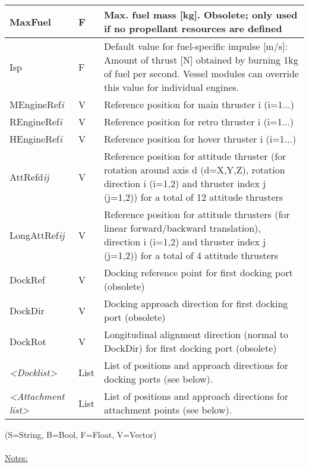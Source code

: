\documentclass[Orbiter Developer Manual.tex]{subfiles}
\begin{document}
\begin{longtable}{ |p{}|p{}|p{}| }
	\hline\rule{0pt}{2ex}
	MaxFuel & F & Max. fuel mass [kg]. Obsolete; only used if no propellant resources are defined\\
	\hline\rule{0pt}{2ex}
	Isp & F & Default value for fuel-specific impulse [m/s]: Amount of thrust [N] obtained by burning 1kg of fuel per second. Vessel modules can override this value for individual engines.\\
	\hline\rule{0pt}{2ex}
	MEngineRef\textit{i} & V & Reference position for main thruster i (i=1...)\\
	\hline\rule{0pt}{2ex}
	REngineRef\textit{i} & V & Reference position for retro thruster i (i=1...)\\
	\hline\rule{0pt}{2ex}
	HEngineRef\textit{i} & V & Reference position for hover thruster i (i=1...)\\
	\hline\rule{0pt}{2ex}
	AttRefd\textit{ij} & V & Reference position for attitude thruster (for rotation around axis d (d=X,Y,Z), rotation direction i (i=1,2) and thruster index j (j=1,2)) for a total of 12 attitude thrusters\\
	\hline\rule{0pt}{2ex}
	LongAttRef\textit{ij} & V & Reference position for attitude thrusters (for linear forward/backward translation), direction i (i=1,2) and thruster index j (j=1,2)) for a total of 4 attitude thrusters\\
	\hline\rule{0pt}{2ex}
	DockRef & V & Docking reference point for first docking port (obsolete)\\
	\hline\rule{0pt}{2ex}
	DockDir & V & Docking approach direction for first docking port (obsolete)\\
	\hline\rule{0pt}{2ex}
	DockRot & V & Longitudinal alignment direction (normal to DockDir) for first docking port (obsolete)\\
	\hline\rule{0pt}{2ex}
	\textit{<Docklist>} & List & List of positions and approach directions for docking ports (see below).\\
	\hline\rule{0pt}{2ex}
	\textit{<Attachment list>} & List & List of positions and approach directions for attachment points (see below).\\
	\hline
	\end{longtable}
\noindent
(S=String, B=Bool, F=Float, V=Vector)\\
\\
\underline{Notes:}
\end{document}
